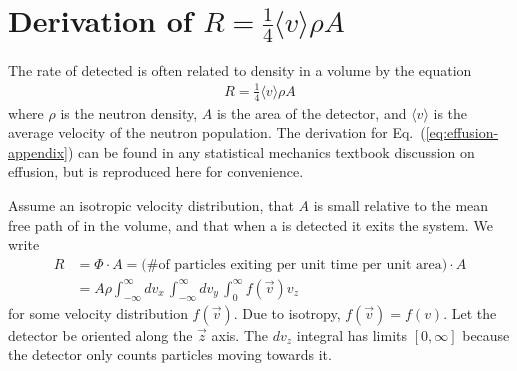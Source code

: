 
\chapter{
    \texorpdfstring{Derivation of $R=\frac{1}{4}\langle v \rangle \rho A$}
    {R=1/4 v rho A}\label{appx:ucn_effusion}
}

The rate of detected \ucn is often related to density in a volume by the equation
%
\begin{gather}
    R=\frac{1}{4}\langle v \rangle \rho A\label{eq:effusion-appendix}
\end{gather}
%
where $\rho$ is the neutron density, $A$ is the area of the detector, and  $\langle v \rangle$ is the average velocity of the neutron population. The derivation for Eq.~(\ref{eq:effusion-appendix}) can be found in any statistical mechanics textbook discussion on effusion, but is reproduced here for convenience.

Assume an isotropic velocity distribution, that $A$ is small relative to the mean free path of \ucn in the volume, and that when a \ucn is detected it exits the system.  We write
%
\begin{align}
    R &=\Phi \cdot A = \text{(\# of particles exiting per unit time per unit area)} \cdot A \nonumber \\
    &= A \rho \int^\infty_{-\infty}dv_x \, \int^\infty_{-\infty}dv_y \, \int^\infty_{0} f(\vec{v})v_z
\end{align}
%
for some velocity distribution $f(\vec{v})$. Due to isotropy, $f(\vec{v})=f(v)$. Let the detector be oriented along the $\vec{z}$ axis. The $dv_z$ integral has limits $[0,\infty]$ because the detector only counts particles moving towards it.

